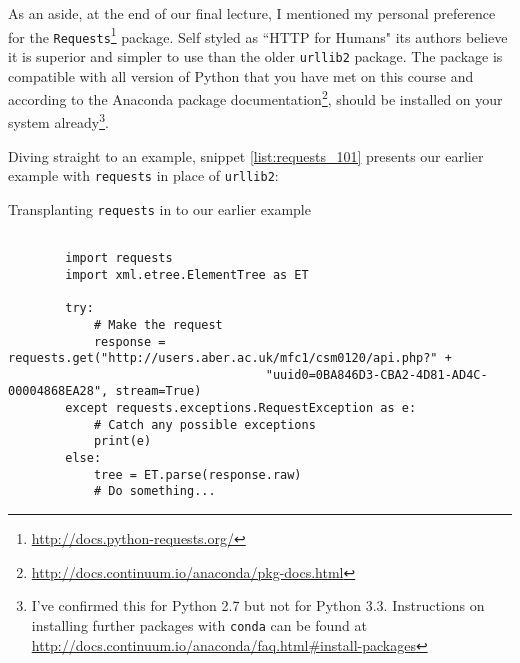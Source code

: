 \documentclass[a4paper]{article}
\begin{document}
As an aside, at the end of our final lecture, I mentioned my personal preference
for the \texttt{Requests}\footnote{{\href{http://docs.python-requests.org/}{http://docs.python-requests.org/}}} package. Self styled as ``HTTP for Humans" its authors
believe it is superior and simpler to use than the older \texttt{urllib2} package.
The package is compatible with all version of Python that you have met on this course
and according to the Anaconda package documentation\footnote{{\href{http://docs.continuum.io/anaconda/pkg-docs.html}{http://docs.continuum.io/anaconda/pkg-docs.html}}},
should be installed on your system already\footnote{I've confirmed this for Python 2.7
but not for Python 3.3. Instructions on installing further packages with \texttt{conda}
can be found at {\href{http://docs.continuum.io/anaconda/faq.html\#install-packages}{http://docs.continuum.io/anaconda/faq.html\#install-packages}}}.

Diving straight to an example, snippet \ref{list:requests_101} presents our earlier
example with \texttt{requests} in place of \texttt{urllib2}:

\begin{listing}[H]
    \caption[]{Transplanting \texttt{requests} in to our earlier example}
    \label{list:requests_101}
    \begin{verbatim}

        import requests
        import xml.etree.ElementTree as ET

        try:
            # Make the request
            response = requests.get("http://users.aber.ac.uk/mfc1/csm0120/api.php?" +
                                    "uuid0=0BA846D3-CBA2-4D81-AD4C-00004868EA28", stream=True)
        except requests.exceptions.RequestException as e:
            # Catch any possible exceptions
            print(e)
        else:
            tree = ET.parse(response.raw)
            # Do something...

    \end{verbatim}
\end{listing}
\end{document}
